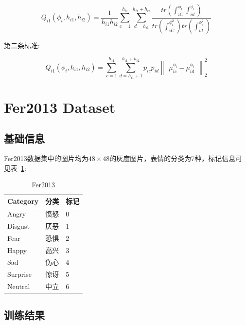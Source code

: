 \documentclass[11pt, a4paper]{article}
\begin{document}
\begin{equation}
Q_{i1} (\phi_i,h_{i1},h_{i2}) = \frac{1}{h_{i1}h_{i2}}\sum_{c=1}^{h_{i1}}\sum_{d=h_{i1}}^{h_{i1} + h_{i2}}\frac{tr(\int_{iC}^{\phi_i}\int_{id}^{\phi_i})}{tr(\int_{iC}^{{\phi}^2_i})tr(\int_{id}^{{\phi}^2_i})}
\end{equation}

第二条标准:

\begin{equation}
Q_{i1} (\phi_i,h_{i1},h_{i2}) = \sum_{c=1}^{h_{i1}}\sum_{d=h_{i1}+1}^{h_{i1}+h_{i2}}p_{ic}p_{id}{\begin{Vmatrix} \mu_{ic}^{\phi_i} - \mu_{id}^{\phi_i} \end{Vmatrix}}^{2}_{2}
\end{equation}

\section{Fer2013 Dataset}

\subsection{基础信息}

Fer2013数据集中的图片均为$48\times 48$的灰度图片，表情的分类为7种，标记信息可见表~\ref{tab:fer2013}:

\begin{table}[htbp] 
	\begin{center}
		\caption{Fer2013}
		\begin{tabular}{|l|l|l|}  \hline
			Category & 分类 & 标记 \\ \hline
		    Angry & 愤怒 & 0 \\ \hline
		    Disgust & 厌恶 & 1 \\ \hline
		    Fear & 恐惧 & 2 \\ \hline
		     Happy & 高兴 & 3 \\ \hline 
		     Sad & 伤心 & 4 \\ \hline
		     Surprise & 惊讶 & 5 \\ \hline
		     Neutral & 中立 & 6 \\ \hline
		\end{tabular}
		
		\label{tab:fer2013}
	\end{center}
\end{table}	

\subsection{训练结果}
\end{document}
